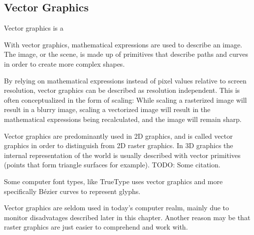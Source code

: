 \subsection{Vector Graphics}
Vector graphics is a 

With vector graphics, mathematical expressions are used to describe an image.
The image, or the scene, is made up of primitives that describe paths and curves in order to create more complex shapes.

By relying on mathematical expressions instead of pixel values relative to screen resolution, vector graphics can be described as resolution independent. This is often conceptualized in the form of scaling: While scaling a rasterized image will result in a blurry image, scaling a vectorized image will result in the mathematical expressions being recalculated, and the image will remain sharp.

Vector graphics are predominantly used in 2D graphics, and is called vector graphics in order to distinguish from 2D raster graphics.
In 3D graphics the internal representation of the world is usually described with vector primitives (points that form triangle surfaces for example).
TODO: Some citation.

Some computer font types, like TrueType uses vector graphics and more specifically Bézier curves to represent glyphs\cite{truetype}.

Vector graphics are seldom used in today's computer realm, mainly due to monitor disadvatages described later in this chapter. Another reason may be that raster graphics are just easier to comprehend and work with.